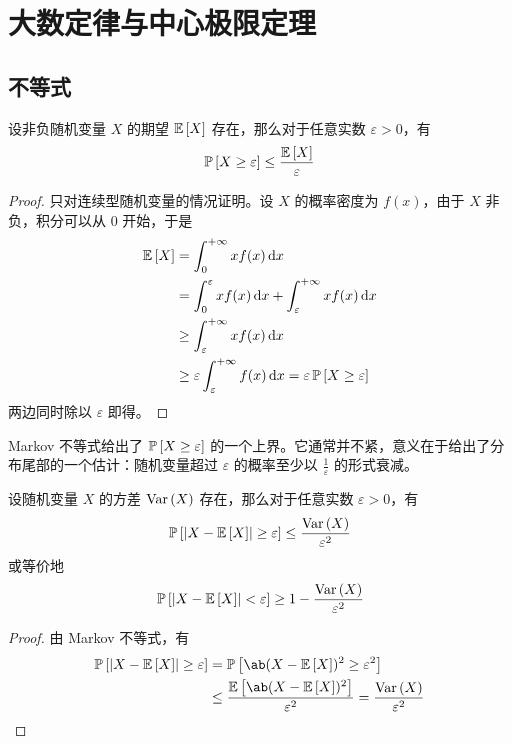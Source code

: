 \section{大数定律与中心极限定理}

\subsection{不等式}

\begin{theorem}
    设非负随机变量 $X$ 的期望 $\operatorname{\mathbb{E}}\left[X\right]$ 存在，那么对于任意实数 $\varepsilon > 0$，有
    $$
    \operatorname{\mathbb{P}}\left[X \ge \varepsilon\right] \le \frac{\operatorname{\mathbb{E}}\left[X\right]}{\varepsilon}
    $$
    \begin{proof}
        只对连续型随机变量的情况证明。设 $X$ 的概率密度为 $f(x)$，由于 $X$ 非负，积分可以从 $0$ 开始，于是
        $$
        \begin{aligned}
            \operatorname{\mathbb{E}}\left[X\right] & = \int_{0}^{+ \infty} x f(x) \dd{x} \\
            & = \int_{0}^{\varepsilon} x f(x) \dd{x} + \int_{\varepsilon}^{+ \infty} x f(x) \dd{x} \\
            & \ge \int_{\varepsilon}^{+ \infty} x f(x) \dd{x} \\
            & \ge \varepsilon \int_{\varepsilon}^{+ \infty} f(x) \dd{x} = \varepsilon \operatorname{\mathbb{P}}\left[X \ge \varepsilon\right]
        \end{aligned}
        $$
        两边同时除以 $\varepsilon$ 即得。
    \end{proof}
\end{theorem}

Markov 不等式给出了 $\operatorname{\mathbb{P}}\left[X \ge \varepsilon\right]$ 的一个上界。它通常并不紧，意义在于给出了分布尾部的一个估计：随机变量超过 $\varepsilon$ 的概率至少以 $\frac{1}{\varepsilon}$ 的形式衰减。

\begin{theorem}
    设随机变量 $X$ 的方差 $\operatorname{Var}\left(X\right)$ 存在，那么对于任意实数 $\varepsilon > 0$，有
    $$
    \operatorname{\mathbb{P}}\left[\abs{X - \operatorname{\mathbb{E}}\left[X\right]} \ge \varepsilon\right] \le \frac{\operatorname{Var}\left(X\right)}{\varepsilon^2}
    $$
    或等价地
    $$
    \operatorname{\mathbb{P}}\left[\abs{X - \operatorname{\mathbb{E}}\left[X\right]} < \varepsilon\right] \ge 1 - \frac{\operatorname{Var}\left(X\right)}{\varepsilon^2}
    $$
    \begin{proof}
        由 Markov 不等式，有
        $$
        \begin{aligned}
            \prob{\abs{X - \expect{X}} \ge \varepsilon} & = \prob{\ab(X - \expect{X})^2 \ge \varepsilon^2} \\
            & \le \frac{\expect{\ab(X - \expect{X})^2}}{\varepsilon^2} = \frac{\variance{X}}{\varepsilon^2}
        \end{aligned}
        $$
    \end{proof}
\end{theorem}

